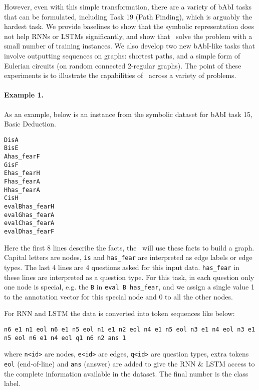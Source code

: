 However, even with this simple transformation, there are a variety of
bAbI tasks that can be formulated, including Task 19 (Path Finding),
which is arguably the hardest task. We provide baselines to show that
the symbolic representation does not help RNNs or LSTMs significantly,
and show that \OurMethodShorts~solve the problem with a small number
of training instances. We also develop two new bAbI-like tasks that
involve outputting sequences on graphs: shortest paths, and a simple
form of Eulerian circuits (on random connected 2-regular graphs).
The point of these experiments is to illustrate the capabilities
of \OurMethodShorts~across a variety of problems.


\paragraph{Example 1. }
As an example, below is an instance from the symbolic dataset for bAbI task 15, Basic
Deduction.
\begin{framed}
\begin{alltt}
D is A
B is E
A has_fear F
G is F
E has_fear H
F has_fear A
H has_fear A
C is H
eval B has_fear      H
eval G has_fear      A
eval C has_fear      A
eval D has_fear      F
\end{alltt}
\end{framed}
Here the first 8 lines describe the facts, the \OurMethodMinorShort~will use
these facts to build a graph.  Capital letters are nodes, \texttt{is} and
\texttt{has\_fear} are interpreted as edge labels or edge types. The last 4
lines are 4 questions asked for this input data. \texttt{has\_fear} in these
lines are interpreted as a question type. For this task, in each question only
one node is special, e.g. the \texttt{B} in \texttt{eval B has\_fear}, and we
assign a single value 1 to the annotation vector for this special node and 0
to all the other nodes.

For RNN and LSTM the data is converted into token
sequences like below:
\begin{framed}
    \texttt{n6 e1 n1 eol n6 e1 n5 eol n1 e1 n2 eol n4 e1 n5 eol n3 e1 n4 eol
    n3 e1 n5 eol n6 e1 n4 eol q1 n6 n2 ans 1}
\end{framed}
where \texttt{n<id>} are nodes, \texttt{e<id>} are edges, \texttt{q<id>} are
question types, extra tokens \texttt{eol} (end-of-line) and \texttt{ans}
(answer) are added to give the RNN \& LSTM access to the complete information
available in the dataset. The final number is the class label.

